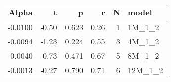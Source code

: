 \begin{table}[ht]
\centering
\begin{tabular}{rrrrrl}
  \hline
Alpha & t & p & r & N & model \\ 
  \hline
-0.0100 & -0.50 & 0.623 & 0.26 & 1 & 1M\_1\_2 \\ 
  -0.0094 & -1.23 & 0.224 & 0.55 & 3 & 4M\_1\_2 \\ 
  -0.0040 & -0.73 & 0.471 & 0.67 & 5 & 8M\_1\_2 \\ 
  -0.0013 & -0.27 & 0.790 & 0.71 & 6 & 12M\_1\_2 \\ 
   \hline
\end{tabular}
\end{table}


